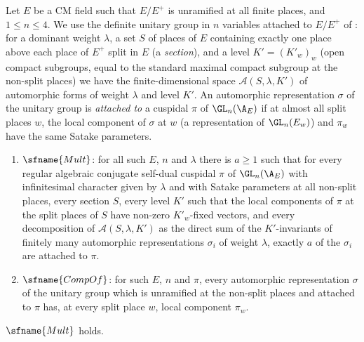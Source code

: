 \begin{definition}\label{pf:modularity:multdef}
Let $E$ be a CM field such that $E/E^+$ is unramified at all finite places, and $1\le n\le4$. We use the definite unitary
group in $n$ variables attached to $E/E^+$ of \cite{LeanSource2026}: for a dominant weight $\lambda$, a set $S$ of places of
$E$ containing exactly one place above each place of $E^+$ split in $E$ (a \emph{section}), and a level $K'=(K'_w)_w$ (open
compact subgroups, equal to the standard maximal compact subgroup at the non-split places) we have the finite-dimensional
space $\mathcal A(S,\lambda,K')$ of automorphic forms of weight $\lambda$ and level $K'$. An automorphic representation
$\sigma$ of the unitary group is \emph{attached to} a cuspidal $\pi$ of $\GL_n(\A_E)$ if at almost all split places $w$, the
local component of $\sigma$ at $w$ (a representation of $\GL_n(E_w)$) and $\pi_w$ have the same Satake parameters.
\begin{enumerate}[label=(\alph*)]
\item $\sfname{Mult}$: for all such $E$, $n$ and $\lambda$ there is $a\ge1$ such that for every regular algebraic conjugate
self-dual cuspidal $\pi$ of $\GL_n(\A_E)$ with infinitesimal character given by $\lambda$ and with Satake parameters at
all non-split places, every section $S$, every level $K'$ such that the local components of $\pi$ at the split places of $S$
have non-zero $K'_w$-fixed vectors, and every decomposition of $\mathcal A(S,\lambda,K')$ as the direct sum of the
$K'$-invariants of finitely many automorphic representations $\sigma_i$ of weight $\lambda$, exactly $a$ of the $\sigma_i$
are attached to $\pi$.
\item $\sfname{CompOf}$: for such $E$, $n$ and $\pi$, every automorphic representation $\sigma$ of the unitary group which is
unramified at the non-split places and attached to $\pi$ has, at every split place $w$, local component $\pi_w$.
\end{enumerate}
\end{definition}

\begin{theorem}\label{pf:modularity:mult}
$\sfname{Mult}$ holds.
\end{theorem}

